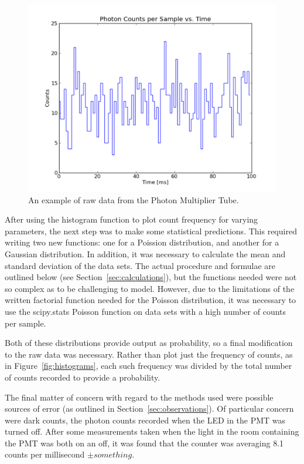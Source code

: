 \documentclass[a4paper,12pt]{article}
\begin{document}
\begin{figure}[h]
\centering
\includegraphics[width=\linewidth]{section4image.pdf}
\caption{An example of raw data from the Photon Multiplier Tube.}
\label{fig:section4}
\end{figure}

After using the histogram function to plot count frequency for varying parameters, the next step was to make some statistical predictions. This required writing two new functions: one for a Poission distribution, and another for a Gaussian distribution. In addition, it was necessary to calculate the mean and standard deviation of the data sets. The actual procedure and formulae are outlined below (see Section~\ref{sec:calculations}), but the functions needed were not so complex as to be challenging to model.  However, due to the limitations of the written factorial function needed for the Poisson distribution, it was necessary to use the scipy.stats Poisson function on data sets with a high number of counts per sample.

Both of these distributions provide output as probability, so a final modification to the raw data was necessary. Rather than plot just the frequency of counts, as in Figure~\ref{fig:histograms}, each such frequency was divided by the total number of counts recorded to provide a probability. 

The final matter of concern with regard to the methods used were possible sources of error (as outlined in Section~\ref{sec:observations}). Of particular concern were dark counts, the photon counts recorded when the LED in the PMT was turned off. After some measurements taken when the light in the room containing the PMT was both on an off, it was found that the counter was averaging 8.1 counts per millisecond $\pm something$.
\end{document}
